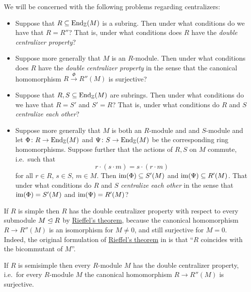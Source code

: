 \begin{fluff}
  We will be concerned with the following problems regarding centralizers:
  \begin{itemize}
    \item
      Suppose that $R \subseteq \operatorname{End}_{\mathbb{Z}}(M)$ is a subring.
      Then under what conditions do we have that $R = R''$?
      That is, under what conditions does $R$ have the \emph{double centralizer property}?
    \item
      Suppose more generally that $M$ is an $R$-module.
      Then under what conditions does $R$ have the \emph{double centralizer property} in the sense that the canonical homomorphism $R \xrightarrow{\Phi} R''(M)$ is surjective?
    \item
      Suppose that $R, S \subseteq \operatorname{End}_{\mathbb{Z}}(M)$ are subrings.
      Then under what conditions do we have that $R = S'$ and $S' = R$?
      That is, under what conditions do $R$ and $S$ \emph{centralize each other}?
    \item
      Suppose more generally that $M$ is both an $R$-module and and $S$-module and let $\Phi \colon R \to \operatorname{End}_{\mathbb{Z}}(M)$ and $\Psi \colon S \to \operatorname{End}_{\mathbb{Z}}(M)$ be the corresponding ring homomorphisms.
      Suppose further that the actions of $R, S$ on $M$ commute, i.e.\ such that
      \[
          r \cdot (s \cdot m)
        = s \cdot (r \cdot m)
      \]
      for all $r \in R$, $s \in S$, $m \in M$.
      Then $\operatorname{im}(\Phi) \subseteq S'(M)$ and $\operatorname{im}(\Psi) \subseteq R'(M)$.
      That under what conditions do $R$ and $S$ \emph{centralize each other} in the sense that $\operatorname{im}(\Phi) = S'(M)$ and $\operatorname{im}(\Psi) = R'(M)$?
  \end{itemize}
\end{fluff}


\begin{example}
  If $R$ is simple then $R$ has the double centralizer property with respect to every submodule $M \trianglelefteq R$ by \hyperref[lemma: rieffels theorem]{Rieffel’s theorem}, because the canonical homomorphism $R \to R''(M)$ is an isomorphism for $M \neq 0$, and still surjective for $M = 0$.
  Indeed, the original formulation of \hyperref[lemma: rieffels theorem]{Rieffel’s theorem} in \cite{Rieffel} is that \enquote{$R$ coincides with the bicommutant of $M$}.
\end{example}


\begin{proposition}
  If $R$ is semisimple then every $R$-module $M$ has the double centralizer property, i.e.\ for every $R$-module $M$ the canonical homomorphism $R \to R''(M)$ is surjective.
\end{proposition}


